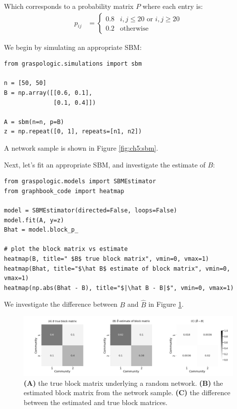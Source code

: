 Which corresponds to a probability matrix $P$ where each entry is:
\begin{align*}
    p_{ij} &= \begin{cases}
    0.8 & i, j \leq 20 \text{ or }i, j \geq 20 \\
    0.2 & \text{otherwise}
    \end{cases}
\end{align*}

We begin by simulating an appropriate SBM:

\begin{lstlisting}[style=python]
from graspologic.simulations import sbm

n = [50, 50]
B = np.array([[0.6, 0.1], 
              [0.1, 0.4]])

A = sbm(n=n, p=B)
z = np.repeat([0, 1], repeats=[n1, n2])
\end{lstlisting}

A network sample is shown in Figure \ref{fig:ch5:sbm}.

Next, let's fit an appropriate SBM, and investigate the estimate of $B$:

\begin{lstlisting}[style=python]
from graspologic.models import SBMEstimator
from graphbook_code import heatmap

model = SBMEstimator(directed=False, loops=False)
model.fit(A, y=z)
Bhat = model.block_p_

# plot the block matrix vs estimate
heatmap(B, title=" $B$ true block matrix", vmin=0, vmax=1)
heatmap(Bhat, title="$\hat B$ estimate of block matrix", vmin=0, vmax=1)
heatmap(np.abs(Bhat - B), title="$|\hat B - B|$", vmin=0, vmax=1)
\end{lstlisting}

We investigate the difference between $B$ and $\hat B$ in Figure \ref{fig:ch6:sbm_est}.

\begin{figure}
    \centering
    \includegraphics[width=\linewidth]{representations/ch6/Images/sbm_est.png}
    \caption[Estimating block matrix of SBM]{\textbf{(A)} the true block matrix underlying a random network. \textbf{(B)} the estimated block matrix from the network sample. \textbf{(C)} the difference between the estimated and true block matrices.}
    \label{fig:ch6:sbm_est}
\end{figure}

